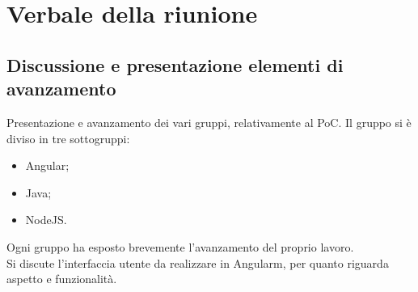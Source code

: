 \section{Verbale della riunione}

	\subsection{Discussione e presentazione elementi di avanzamento}
	Presentazione e avanzamento dei vari gruppi, relativamente al PoC. Il gruppo si è diviso in tre sottogruppi:
	\begin{itemize}
		\item Angular;
		\item Java;
		\item NodeJS.
	\end{itemize}
	Ogni gruppo ha esposto brevemente l'avanzamento del proprio lavoro.\\
    Si discute l'interfaccia utente da realizzare in Angularm, per quanto riguarda aspetto e funzionalità.